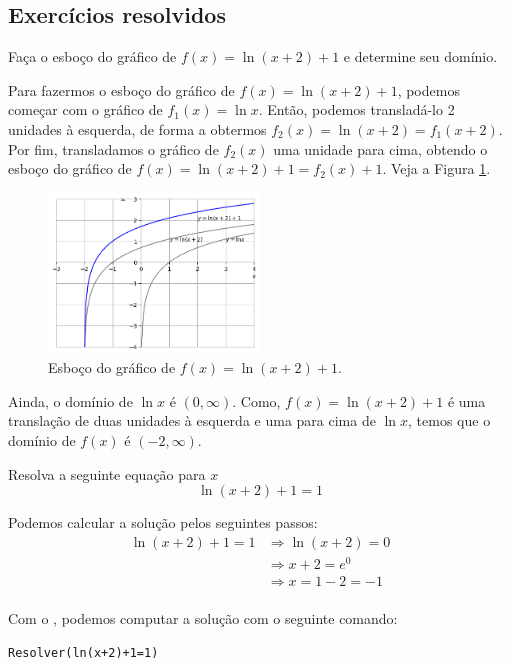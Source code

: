 \documentclass[../main.tex]{subfiles}
\begin{document}
\subsection{Exercícios resolvidos}
\begin{exeresol}
  Faça o esboço do gráfico de $f(x) = \ln(x+2)+1$ e determine seu domínio.
  \begin{resol}
  Para fazermos o esboço do gráfico de $f(x) = \ln(x+2)+1$, podemos começar com o gráfico de $f_1(x) = \ln x$. Então, podemos transladá-lo 2 unidades à esquerda, de forma a obtermos $f_2(x) = \ln(x+2) = f_1(x+2)$. Por fim, transladamos o gráfico de $f_2(x)$ uma unidade para cima, obtendo o esboço do gráfico de $f(x) = \ln(x+2)+1=f_2(x)+1$. Veja a Figura \ref{fig:exeresol_lograf}.

  \begin{figure}[H]
    \centering
    \includegraphics[width=0.5\textwidth]{fig_func/fig_exeresol_lograf}
    \caption{Esboço do gráfico de $f(x) = \ln(x+2)+1$.}
    \label{fig:exeresol_lograf}
  \end{figure}

Ainda, o domínio de $\ln x$ é $(0, \infty)$. Como, $f(x) = \ln(x+2)+1$ é uma translação de duas unidades à esquerda e uma para cima de $\ln x$, temos que o domínio de $f(x)$ é $(-2, \infty)$.
\end{resol}
\end{exeresol}
\begin{exeresol}
  Resolva a seguinte equação para $x$
  \begin{equation}
    \ln(x+2) + 1 = 1
  \end{equation}
  \begin{solution}
  Podemos calcular a solução pelos seguintes passos:
  \begin{align*}
    \ln(x+2)+1=1 &\Rightarrow \ln(x+2)=0\\
                 &\Rightarrow x+2=e^0\\
                 &\Rightarrow x=1-2=-1\\
  \end{align*}

  Com o \geogebra, podemos computar a solução com o seguinte comando:
\begin{verbatim}
Resolver(ln(x+2)+1=1)
\end{verbatim}
\end{solution}
\end{exeresol}
\end{document}
